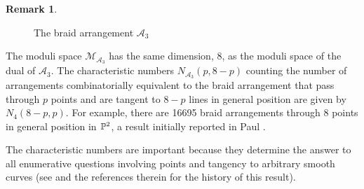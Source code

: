 \documentclass[12pt]{article}
\theoremstyle{plain}
\theoremstyle{definition}
\newtheorem{remark}[theorem]{Remark}
\newcommand{\M}{\mathcal{M}}
\renewcommand{\P}{\ensuremath \mathbb{P}}
\begin{document}
\begin{remark}
\begin{figure}[h!t]
\begin{center}
\end{center}
\caption{The braid arrangement $\mathcal{A}_3$ } \label{braid}
\end{figure}

The moduli space $\M_{\mathcal{A}_3}$ has the same dimension, 8, as the
moduli space of the dual of $\mathcal{A}_3$. The characteristic numbers
$N_{\mathcal{A}_3}(p,8-p)$ counting the number of arrangements
combinatorially equivalent to the braid arrangement that pass through
$p$ points and are tangent to $8-p$ lines in general position are
given by $N_4(8-p,p)$. For example, there are 16695 braid arrangements
through 8 points in general position in $\P^2$, a result initially
reported in Paul \cite{Paul}.
\end{remark}

The characteristic numbers are important because they determine the
answer to all enumerative questions involving points and tangency to
arbitrary smooth curves (see \cite[section 10.4]{Fulton} and the
references therein for the history of this result). 
\end{document}
